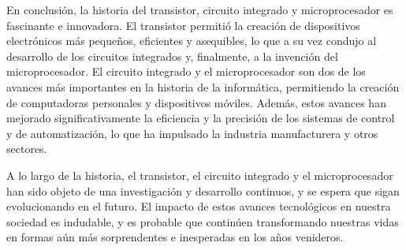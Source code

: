 \documentclass{article}
\begin{document}
En conclusión, la historia del transistor, circuito integrado y microprocesador es fascinante e innovadora.  
El transistor permitió la creación de dispositivos electrónicos más pequeños, eficientes y asequibles, 
lo que a su vez condujo al desarrollo de los circuitos integrados y, finalmente, a la invención del microprocesador.
El circuito integrado y el microprocesador son dos de los avances más importantes en la historia de la informática, 
permitiendo la creación de computadoras personales y dispositivos móviles. Además, estos avances han mejorado 
significativamente la eficiencia y la precisión de los sistemas de control y de automatización, lo que ha 
impulsado la industria manufacturera y otros sectores.

A lo largo de la historia, el transistor, el circuito integrado y el microprocesador han sido objeto de una investigación 
y desarrollo continuos, y se espera que sigan evolucionando en el futuro. El impacto de estos avances tecnológicos 
en nuestra sociedad es indudable, y es probable que continúen transformando nuestras vidas 
en formas aún más sorprendentes e inesperadas en los años venideros.




\end{document}
